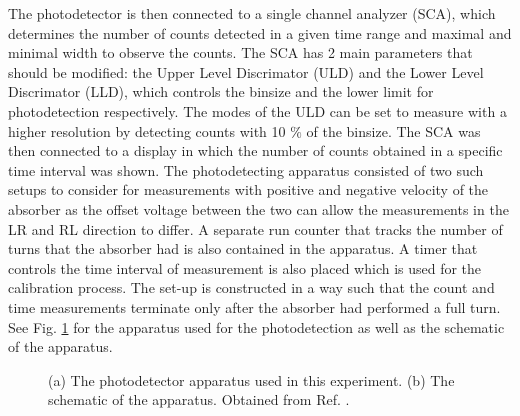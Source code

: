 \documentclass[a4paper]{report}
\numberwithin{equation}{section}
\begin{document}
The photodetector is then connected to a single channel analyzer (SCA), which determines the number of counts detected
in a given time range and maximal and minimal width to observe the counts. The SCA has 2 main parameters that should be modified:
the Upper Level Discrimator (ULD) and the Lower Level Discrimator (LLD), which controls the binsize and the lower limit for 
photodetection respectively. The modes of the ULD can be set to measure with a higher resolution by detecting counts with 
10 $\%$ of the binsize. The SCA was then connected to a display in which the number of counts obtained in a specific time 
interval was shown. 
The photodetecting apparatus consisted of two such setups to consider for measurements with positive and negative velocity 
of the absorber as the offset voltage between the two can allow the measurements in the LR and RL direction to differ.
A separate run counter that tracks the number of turns that the absorber had is also contained in the apparatus. A timer 
that controls the time interval of measurement is also placed which is used for the calibration process. The set-up is 
constructed in a way such that the count and time measurements terminate only after the absorber had performed a full turn. 
See Fig. \ref{fig:apparatus_raw} for the apparatus used for the photodetection as well as the schematic of the apparatus. \par 

\begin{figure}[htb!]
	\centering
	\quad
	\centering
	\caption{(a) The photodetector apparatus used in this experiment. (b) The schematic of the apparatus. Obtained from 
			Ref. \cite{k2212016}.}
	\label{fig:apparatus_raw}
\end{figure}

\end{document}
